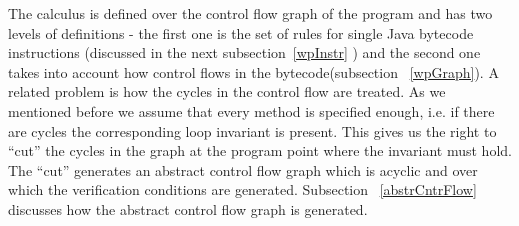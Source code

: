 The calculus is defined over the control flow graph of the program and has two levels of definitions - the first one is the set of rules for single Java bytecode instructions (discussed in the next subsection~\ref{wpInstr} ) and the second one takes into account how control
 flows in the bytecode(subsection ~\ref{wpGraph}). A related problem is how the cycles in the control flow are treated. 
As we mentioned before we assume that every method is specified enough, i.e. if there are cycles the corresponding 
loop invariant is present. This gives us the right to ``cut'' the cycles in the graph at the program point where the invariant must hold. 
The ``cut'' generates an abstract control flow graph which is acyclic and over which the verification conditions are generated. Subsection ~\ref{abstrCntrFlow} discusses 
how the abstract control flow graph is generated.













